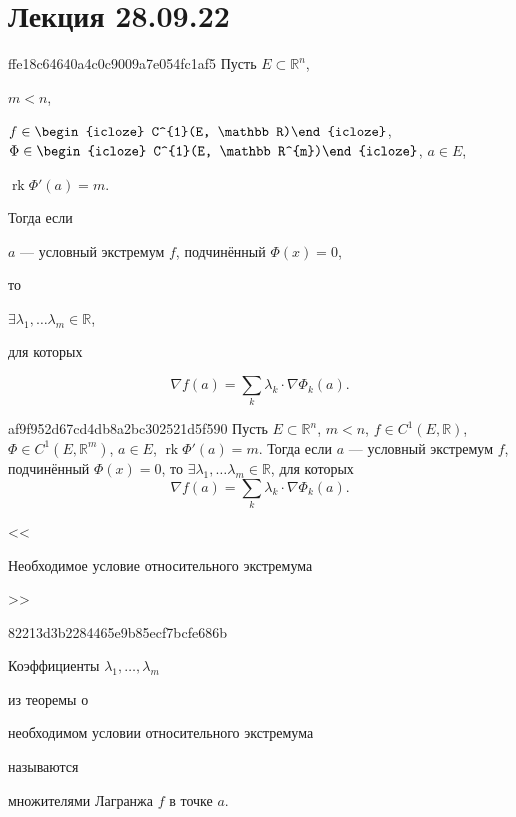 \section{Лекция 28.09.22}
\begin{note}{ffe18c64640a4c0c9009a7e054fc1af5}
    Пусть \({ E \subset \mathbb R^{n} }\), \begin{icloze}{6}\({ m < n }\),\end{icloze} \({ f \in \begin{icloze}{4}C^{1}(E, \mathbb R)\end{icloze} }\), \({ \Phi \in \begin{icloze}{4}C^{1}(E, \mathbb R^{m})\end{icloze} }\), \({ a \in E }\), \begin{icloze}{5}\({ \operatorname{rk} \Phi'(a) = m }\).\end{icloze}
    Тогда если \begin{icloze}{3}\({ a }\) --- условный экстремум \({ f }\), подчинённый \({ \Phi(x) = 0 }\),\end{icloze} то \begin{icloze}{2}\({ \exists \lambda_1, \ldots \lambda_m \in \mathbb R }\),\end{icloze} для которых
    \begin{icloze}{1}
        \[
            \nabla f(a) = \sum_{k} \lambda_k \cdot \nabla \Phi_k(a).
        \]
    \end{icloze}
\end{note}

\begin{note}{af9f952d67cd4db8a2bc302521d5f590}
    Пусть \({ E \subset \mathbb R^{n} }\), \({ m < n }\), \({ f \in C^{1}(E, \mathbb R) }\), \({ \Phi \in C^{1}(E, \mathbb R^{m}) }\), \({ a \in E }\), \({ \operatorname{rk} \Phi'(a) = m }\).
    Тогда если \({ a }\) --- условный экстремум \({ f }\), подчинённый \({ \Phi(x) = 0 }\), то \({ \exists \lambda_1, \ldots \lambda_m \in \mathbb R }\), для которых
    \[
        \nabla f(a) = \sum_{k} \lambda_k \cdot \nabla \Phi_k(a).
    \]

    \begin{center}
        \tiny
        <<\begin{icloze}{1}Необходимое условие относительного экстремума\end{icloze}>>
    \end{center}
\end{note}

\begin{note}{82213d3b2284465e9b85ecf7bcfe686b}
    \begin{icloze}{2}Коэффициенты \({ \lambda_1, \ldots, \lambda_m }\)\end{icloze} из теоремы о \begin{icloze}{3}необходимом условии относительного экстремума\end{icloze} называются \begin{icloze}{1}множителями Лагранжа \({ f }\) в точке \({ a }\).\end{icloze}
\end{note}

